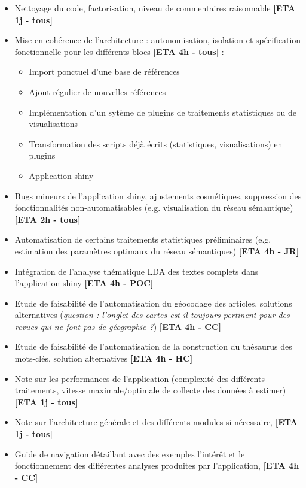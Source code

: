 \documentclass[11pt]{article}
\begin{document}
\begin{itemize}
\item Nettoyage du code, factorisation, niveau de commentaires raisonnable \textbf{[ETA 1j - tous]}
\item Mise en cohérence de l'architecture : autonomisation, isolation et spécification fonctionnelle pour les différents blocs \textbf{[ETA 4h - tous]} : 
\begin{itemize}
\item Import ponctuel d'une base de références
\item Ajout régulier de nouvelles références
\item Implémentation d'un sytème de plugins de traitements statistiques ou de visualisations
\item Transformation des scripts déjà écrits (statistiques, visualisations) en plugins 
\item Application shiny
\end{itemize}
\item Bugs mineurs de l'application shiny, ajustements cosmétiques, suppression des fonctionnalités non-automatisables (e.g. visualisation du réseau sémantique) \textbf{[ETA 2h - tous]}
\item Automatisation de certains traitements statistiques préliminaires (e.g. estimation des paramètres optimaux du réseau sémantiques) \textbf{[ETA 4h - JR]}
\item Intégration de l'analyse thématique LDA des textes complets dans l'application shiny \textbf{[ETA 4h - POC]}
\item Etude de faisabilité de l'automatisation du géocodage des articles, solutions alternatives (\textit{question : l'onglet des cartes est-il toujours pertinent pour des revues qui ne font pas de géographie ?}) \textbf{[ETA 4h - CC]}
\item Etude de faisabilité de l'automatisation de la construction du thésaurus des mots-clés, solution alternatives \textbf{[ETA 4h - HC]}
\item Note sur les performances de l'application (complexité des différents traitements, vitesse maximale/optimale de collecte des données à estimer) \textbf{[ETA 1j - tous]}
\item Note sur l'architecture générale et des différents modules si nécessaire,  \textbf{[ETA 1j - tous]}
\item Guide de navigation détaillant avec des exemples l'intér{\^e}t et le fonctionnement des différentes analyses produites par l'application,  \textbf{[ETA 4h - CC]}
\end{itemize}
\end{document}
